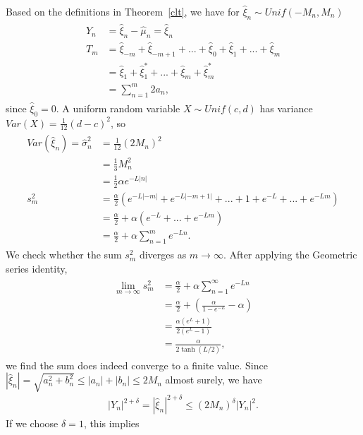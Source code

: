 Based on the definitions in Theorem~\ref{clt}, we have for
$\hat{\xi}_n \sim Unif(-M_n,M_n)$
\begin{align*}
\begin{split}
Y_n &= \hat{\xi}_n - \hat{\mu}_n = \hat{\xi}_n\\
T_m &= \hat{\xi}_{-m}+\hat{\xi}_{-m+1}+ ...+\hat{\xi}_{0}+\hat{\xi}_{1}+...+\hat{\xi}_{m}\\
&=
\hat{\xi}_{1}+\hat{\xi}_{1}^*+...+\hat{\xi}_{m}+\hat{\xi}_{m}^*\\
&= \sum_{n=1}^{m} 2a_n,
\end{split}
\end{align*}
since $\hat{\xi}_{0} = 0$. A uniform random variable $X\sim Unif(c,d)$ has variance
$Var(X) = \frac{1}{12}(d-c)^2$, so
\begin{align*}
\begin{split}
Var(\hat{\xi}_n) = \hat{\sigma}_n^2  &= \frac{1}{12}(2M_n)^2\\
&= \frac{1}{3}M_n^2\\
&= \frac{1}{2}\alpha e^{-L|n|}\\
s_m^2 &= \frac{\alpha}{2}\left(e^{-L|-m|}+e^{-L|-m+1|}+...+1+e^{-L}+...+e^{-Lm} \right)\\
&= \frac{\alpha}{2} + \alpha \left(e^{-L}+... + e^{-Lm} \right)\\
&=\frac{\alpha}{2} +\alpha\sum_{n=1}^m e^{-Ln}.
\end{split}
\end{align*}
We check whether the sum $s_m^2$ diverges as $m \to \infty$. After applying the Geometric series identity,
\begin{align*}
\begin{split}
\lim_{m\to \infty}s_m^2 &=\frac{\alpha}{2} +\alpha\sum_{n=1}^\infty e^{-Ln}\\
&= \frac{\alpha}{2} + \left( \frac{\alpha}{1-e^{-L}}- \alpha\right)\\
&= \frac{\alpha(e^L+1)}{2(e^L-1)}\\
&= \frac{\alpha}{2 \tanh(L/2)},
\end{split}
\end{align*}
we find the sum does indeed converge to a finite value. Since
$|\hat{\xi}_n| = \sqrt{a_n^2 + b_n^2} \leq |a_n|+|b_n| \leq 2M_n$
almost surely, we have
\begin{align*}
|Y_n|^{2+\delta} = |\hat{\xi}_n|^{2+\delta} \leq (2M_n)^\delta|Y_n|^2.
\end{align*}
If we choose $\delta = 1$, this implies
